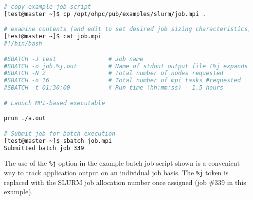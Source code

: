 \begin{lstlisting}[language=bash,keywords={}]
# copy example job script
[test@master ~]$ cp /opt/ohpc/pub/examples/slurm/job.mpi .

# examine contents (and edit to set desired job sizing characteristics)
[test@master ~]$ cat job.mpi
#!/bin/bash

#SBATCH -J test               # Job name
#SBATCH -o job.%j.out         # Name of stdout output file (%j expands to %jobId)
#SBATCH -N 2                  # Total number of nodes requested
#SBATCH -n 16                 # Total number of mpi tasks #requested
#SBATCH -t 01:30:00           # Run time (hh:mm:ss) - 1.5 hours

# Launch MPI-based executable

prun ./a.out

# Submit job for batch execution
[test@master ~]$ sbatch job.mpi
Submitted batch job 339

\end{lstlisting}

\begin{center}
\begin{tcolorbox}[]
\small
The use of the \texttt{\%j} option in the example batch job script shown is a convenient
way to track application output on an individual job basis. The \texttt{\%j} token
is replaced with the SLURM job allocation number once assigned (job \#339 in
this example).
\end{tcolorbox}
\end{center}





